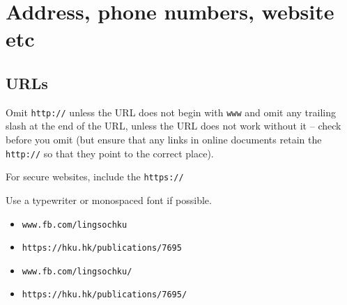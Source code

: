 \documentclass[11pt,a4paper]{book}
\newcommand{\xmark}{{\color{cadmiumred}\ding{54}}}%
\newcommand{\cmark}{{\color{green(html/cssgreen)}\checkmark}}%
\begin{document}
					\section{Address, phone numbers, website etc}
					\subsection{URLs}
					Omit \texttt{http://} unless the URL does not begin with \texttt{www} and omit any trailing slash at the end of the URL, unless the URL does not work without it -- check before you omit (but ensure that any links in online documents retain the \texttt{http://} so that they point to the correct place).\par
					For secure websites, include the \texttt{https://}\par
					Use a typewriter or monospaced font if possible.
						{\firasans \begin{mdframed}[backgroundcolor=aliceblue] \begin{itemize}[label=\cmark]
							\item\texttt{www.fb.com/lingsochku}
							\item \texttt{https://hku.hk/publications/7695}
							\item[\xmark] \texttt{www.fb.com/lingsochku/}
							\item[\xmark] \texttt{https://hku.hk/publications/7695/}
						\end{itemize} \end{mdframed} }
\end{document}
